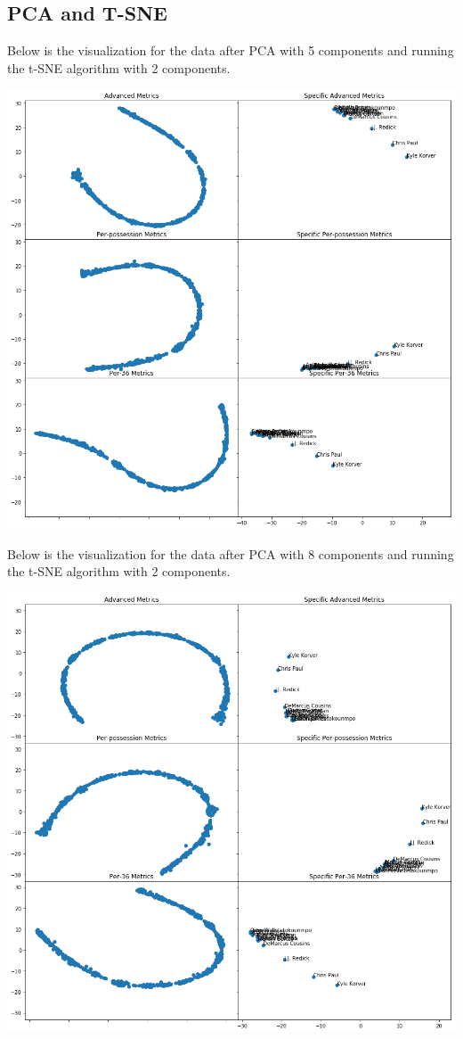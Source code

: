 \documentclass[12pt]{article}
\begin{document}
    \subsection{PCA and T-SNE}
    Below is the visualization for the data after PCA with 5 components and running the t-SNE algorithm with 2 components.
    \begin{center}
        \includegraphics[scale=0.5]{images/pca-5}
    \end{center}
    Below is the visualization for the data after PCA with 8 components and running the t-SNE algorithm with 2 components.
    \begin{center}
        \includegraphics[scale=0.5]{images/pca-8}
    \end{center}
\end{document}
